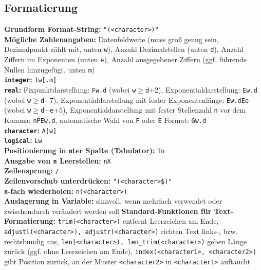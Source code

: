 \documentclass[a4paper, twocolumn]{scrarticle}
\begin{document}
\subsection{Formatierung}
\textbf{Grundform Format-String:} \lstinline|"(<character>)"|\\
\textbf{Mögliche Zahlenangaben:}  Datenfeldweite (muss groß genug sein, Dezimalpunkt zählt mit, unten \lstinline|w|), Anzahl Dezimalstellen (unten \lstinline|d|), Anzahl Ziffern im Exponenten (unten \lstinline|e|), Anzahl ausgegebener Ziffern (ggf. führende Nullen hinzugefügt, unten \lstinline|m|)\\
\textbf{\lstinline|integer|:} \lstinline|Iw[.m]|\\
\textbf{\lstinline|real|:} Fixpunktdarstellung: \lstinline|Fw.d| (wobei \lstinline|w|$\geq$\lstinline|d|$+2$), Exponentialdarstellung: \lstinline|Ew.d| (wobei \lstinline|w|$\geq$\lstinline|d|$+7$), Exponentialdarstellung mit fester Exponentenlänge: \lstinline|Ew.dEe| (wobei \lstinline|w|$\geq$\lstinline|d|$+$\lstinline|e|$+5$), Exponentialdarstellung mit fester Stellenzahl \lstinline|n| vor dem Komma: \lstinline|nPEw.d|, automatische Wahl von \lstinline|F| oder \lstinline|E| Format: \lstinline|Gw.d|\\
\textbf{\lstinline|character|:} \lstinline|A[w]|\\
\textbf{\lstinline|logical|:} \lstinline|Lw|\\
\textbf{Positionierung in \lstinline|n|ter Spalte (Tabulator):} \lstinline|Tn|\\
\textbf{Ausgabe von \lstinline|n| Leerstellen:} \lstinline|nX|\\
\textbf{Zeilensprung:} \lstinline|/|\\
\textbf{Zeilenvorschub unterdrücken:} \lstinline|"(<character>$)"|\\
\textbf{\lstinline|n|-fach wiederholen:} \lstinline|n(<character>)|\\
\textbf{Auslagerung in Variable:} sinnvoll, wenn mehrfach verwendet oder  zwischendurch verändert werden soll
\textbf{Standard-Funktionen für Text-Formatierung:} \lstinline|trim(<character>)| entfernt Leerzeichen am Ende, \lstinline|adjustl(<character>), adjustr(<character>)| richten Text links-, bzw. rechtsbündig aus, \lstinline|len(<character>), len_trim(<character>)| geben Länge zurück (ggf. ohne Leerzeichen am Ende), \lstinline|index(<character1>, <character2>)| gibt Position zurück, an der Muster \lstinline|<character2>| in \lstinline|<character1>| auftaucht 
\end{document}
